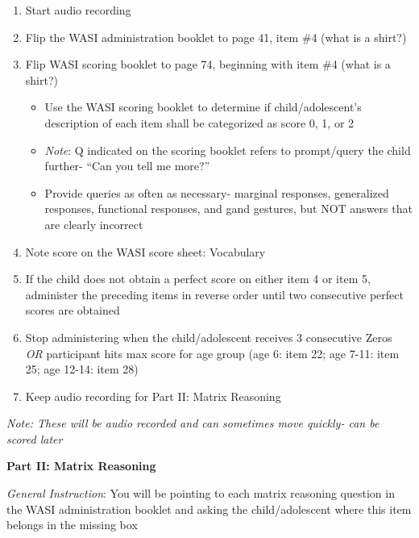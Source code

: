 \documentclass[]{book}
\providecommand{\tightlist}{%
  \setlength{\itemsep}{0pt}\setlength{\parskip}{0pt}}
\begin{document}
\begin{enumerate}
\def\labelenumi{\arabic{enumi}.}
\tightlist
\item
  Start audio recording
\item
  Flip the WASI administration booklet to page 41, item \#4 (what is a shirt?)
\item
  Flip WASI scoring booklet to page 74, beginning with item \#4 (what is a shirt?)

  \begin{itemize}
  \tightlist
  \item
    Use the WASI scoring booklet to determine if child/adolescent's description of each item shall be categorized as score 0, 1, or 2
  \item
    \emph{Note}: Q indicated on the scoring booklet refers to prompt/query the child further- ``Can you tell me more?''
  \item
    Provide queries as often as necessary- marginal responses, generalized responses, functional responses, and gand gestures, but NOT answers that are clearly incorrect
  \end{itemize}
\item
  Note score on the WASI score sheet: Vocabulary
\item
  If the child does not obtain a perfect score on either item 4 or item 5, administer the preceding items in reverse order until two consecutive perfect scores are obtained
\item
  Stop administering when the child/adolescent receives 3 consecutive Zeros \emph{OR} participant hits max score for age group (age 6: item 22; age 7-11: item 25; age 12-14: item 28)
\item
  Keep audio recording for Part II: Matrix Reasoning
\end{enumerate}

\emph{Note: These will be audio recorded and can sometimes move quickly- can be scored later}

\textbf{Part II: Matrix Reasoning}

\emph{General Instruction}: You will be pointing to each matrix reasoning question in the WASI administration booklet and asking the child/adolescent where this item belongs in the missing box
\end{document}
